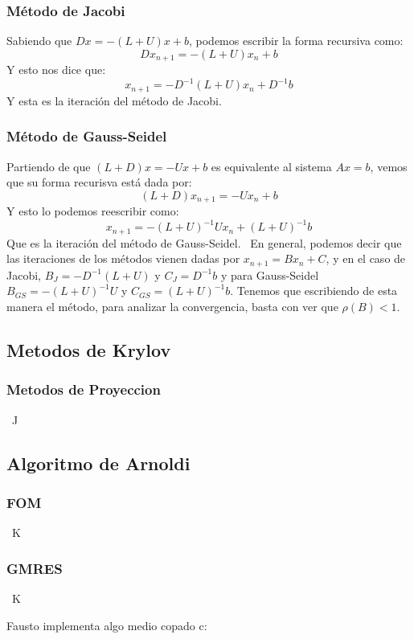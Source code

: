 \documentclass[12pt, oneside]{book}
\begin{document}
\subsubsection{Método de Jacobi}
Sabiendo que $Dx=-(L+U)x+b$, podemos escribir la forma recursiva como: $$Dx_{n+1}=-(L+U)x_n+b$$ Y esto nos dice que: $$x_{n+1}=-D^{-1}(L+U)x_n+D^{-1}b$$ Y esta es la iteración del método de Jacobi.
\subsubsection{Método de Gauss-Seidel}
Partiendo de que $(L+D)x=-Ux+b$ es equivalente al sistema $Ax=b$, vemos que su forma recurisva está dada por: $$(L+D)x_{n+1}=-Ux_n+b$$ Y esto lo podemos reescribir como: $$x_{n+1}=-(L+U)^{-1}Ux_n+(L+U)^{-1}b$$ Que es la iteración del método de Gauss-Seidel.
\ En general, podemos decir que las iteraciones de los métodos vienen dadas por $x_{n+1}=Bx_n+C$, y en el caso de Jacobi, $B_J=-D^{-1}(L+U)$ y $C_J=D^{-1}b$ y para Gauss-Seidel $B_{GS}=-(L+U)^{-1}U$ y $C_{GS}=(L+U)^{-1}b$. Tenemos que escribiendo de esta manera el método, para analizar la convergencia, basta con ver que $\rho(B)<1$.

	\subsection{Metodos de Krylov}
	\subsubsection{Metodos de Proyeccion}
	\ J
	\subsection{Algoritmo de Arnoldi}
	\subsubsection{FOM}
	\ K
	\subsubsection{GMRES}
	\ K
	
	
	Fausto implementa algo medio copado c:
	
\end{document}
